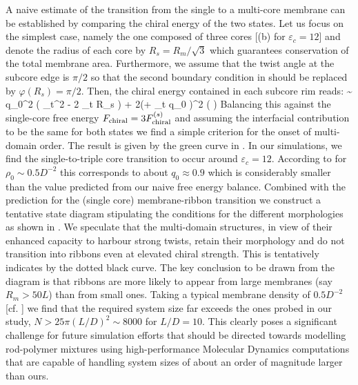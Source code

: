  A naive estimate of the transition from the single to a multi-core membrane can be established by comparing the chiral energy of the two states. Let us focus on the simplest case, namely the one composed of three cores [(b) for $\varepsilon_{c}=12$] and denote the radius of each core by $R_{s} = R_{m}/\sqrt{3}$ which guarantees conservation of the total membrane area. Furthermore, we assume that the twist angle at the subcore edge is $\pi/2$ so that the second boundary condition in  should be replaced by $\varphi(R_{s}) = \pi/2 $. Then, the chiral energy contained in each subcore rim reads:
 \beq
   \sim {} q_{0}^{2} \left ( \lambda_{t}^{2} - 2 \lambda_{t} R_{s} \right ) + 2(\pi + \lambda_{t} q_{0} )^{2} \ln \left (  \right ) 
 \eeq
Balancing this against the single-core free energy $F_{\rm chiral} = 3 F_{\rm chiral}^{(s)}$ and assuming the interfacial contribution to be the same for both states we find a simple criterion for the onset of multi-domain order. The result is given by the green curve in .  In our simulations, we find the single-to-triple core transition to occur around $\varepsilon_{c} =12$.  According to  for $\rho_{0} \sim 0.5D^{-2}$ this  corresponds to about $q_{0} \approx 0.9$ which is considerably smaller than the value predicted from our naive free energy balance. Combined with the prediction for the (single core) membrane-ribbon transition we construct a tentative state diagram stipulating the conditions for the different morphologies as shown in . We speculate that the multi-domain structures, in view of their enhanced capacity to harbour strong twists,  retain their morphology and do not transition into ribbons even at elevated chiral strength. This is tentatively indicates by the dotted black curve. The key conclusion to be drawn  from the diagram is that ribbons are more likely to appear from large membranes (say $R_{m}  > 50 L$) than from small ones. Taking a typical membrane density of $0.5 D^{-2}$ [cf. ] we find that the required system size far exceeds the ones probed in our study,  $N > 25 \pi (L/D)^{2} \sim 8000$ for $L/D = 10$.  This clearly poses a significant challenge for future simulation efforts that should be directed towards modelling rod-polymer mixtures using high-performance Molecular Dynamics computations \cite{LAMMPS,WSFip} that are capable of handling system sizes of about an order of magnitude larger than ours. 







